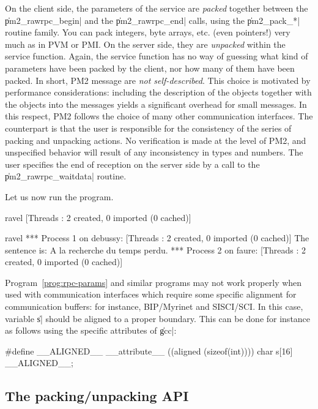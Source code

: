 On the client side, the parameters of the service are \emph{packed}
together between the \|pm2_rawrpc_begin| and the \|pm2_rawrpc_end|
calls, using the \|pm2_pack_*| routine family. You can pack integers,
byte arrays, etc. (even pointers!) very much as in PVM or PMI.  On the
server side, they are \emph{unpacked} within the service function.
Again, the service function has no way of guessing what kind of
parameters have been packed by the client, nor how many of them have
been packed. In short, PM2 message are \emph{not self-described}.
This choice is motivated by performance considerations: including the
description of the objects together with the objects into the messages
yields a significant overhead for small messages. In this respect, PM2
follows the choice of many other communication interfaces. The
counterpart is that the user is responsible for the consistency of the
series of packing and unpacking actions. No verification is made at
the level of PM2, and unspecified behavior will result of any
inconsistency in types and numbers. The user specifies the end of
reception on the server side by a call to the \|pm2_rawrpc_waitdata|
routine.

Let us now run the program.
\begin{shell}
ravel%
[Threads : 2 created, 0 imported (0 cached)]

ravel%
*** Process 1 on debussy:
[Threads : 2 created, 0 imported (0 cached)]
The sentence is: A la recherche du temps perdu.
*** Process 2 on faure:
[Threads : 2 created, 0 imported (0 cached)]
\end{shell}

\begin{warning}
  Program~\ref{prog:rpc-params} and similar programs may not work
  properly when used with communication interfaces which require some
  specific alignment for communication buffers: for instance,
  BIP/Myrinet and SISCI/SCI. In this case, variable \|s| should
  be aligned to a proper boundary. This can be done for instance as
  follows using the specific attributes of \|gcc|:
\begin{program}
#define __ALIGNED__ __attribute__ ((aligned (sizeof(int))))
char s[16] __ALIGNED__;
\end{program}
\end{warning}

\subsection{The packing/unpacking API}


